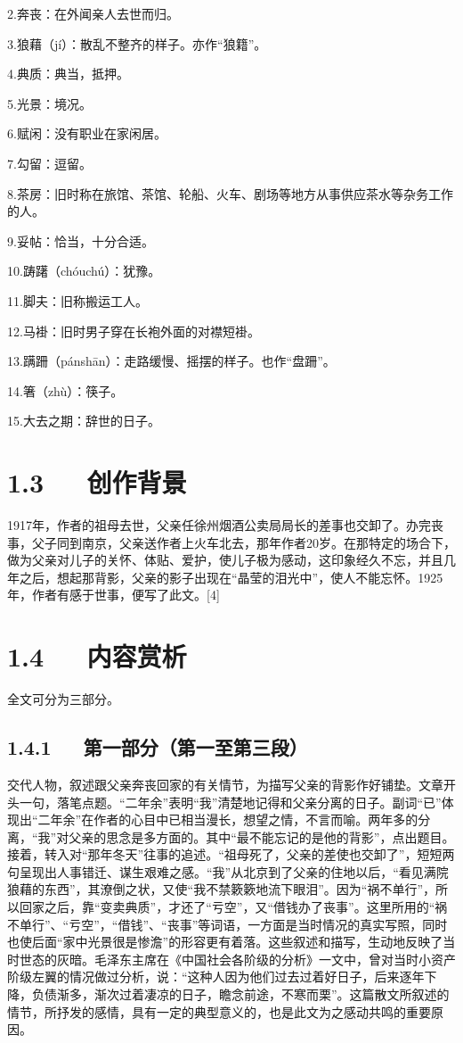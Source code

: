 \documentclass[letterpaper,10pt,english]{sphinxmanual}
\begin{document}
2.奔丧：在外闻亲人去世而归。

3.狼藉（jí）：散乱不整齐的样子。亦作“狼籍”。

4.典质：典当，抵押。

5.光景：境况。

6.赋闲：没有职业在家闲居。

7.勾留：逗留。

8.茶房：旧时称在旅馆、茶馆、轮船、火车、剧场等地方从事供应茶水等杂务工作的人。

9.妥帖：恰当，十分合适。

10.踌躇（chóuchú）：犹豫。

11.脚夫：旧称搬运工人。

12.马褂：旧时男子穿在长袍外面的对襟短褂。

13.蹒跚（pánshān）：走路缓慢、摇摆的样子。也作“盘跚”。

14.箸（zhù）：筷子。

15.大去之期：辞世的日子。


\section{1.3   创作背景}
\label{\detokenize{p01_u6563_u6587/_u6731_u81ea_u6e05-_u80cc_u5f71:id5}}
1917年，作者的祖母去世，父亲任徐州烟酒公卖局局长的差事也交卸了。办完丧事，父子同到南京，父亲送作者上火车北去，那年作者20岁。在那特定的场合下，做为父亲对儿子的关怀、体贴、爱护，使儿子极为感动，这印象经久不忘，并且几年之后，想起那背影，父亲的影子出现在“晶莹的泪光中”，使人不能忘怀。1925年，作者有感于世事，便写了此文。{[}4{]}


\section{1.4   内容赏析}
\label{\detokenize{p01_u6563_u6587/_u6731_u81ea_u6e05-_u80cc_u5f71:id6}}
全文可分为三部分。


\subsection{1.4.1   第一部分（第一至第三段）}
\label{\detokenize{p01_u6563_u6587/_u6731_u81ea_u6e05-_u80cc_u5f71:id7}}
交代人物，叙述跟父亲奔丧回家的有关情节，为描写父亲的背影作好铺垫。文章开头一句，落笔点题。“二年余”表明“我”清楚地记得和父亲分离的日子。副词“已”体现出“二年余”在作者的心目中已相当漫长，想望之情，不言而喻。两年多的分离，“我”对父亲的思念是多方面的。其中“最不能忘记的是他的背影”，点出题目。接着，转入对“那年冬天”往事的追述。“祖母死了，父亲的差使也交卸了”，短短两句呈现出人事错迁、谋生艰难之感。“我”从北京到了父亲的住地以后，“看见满院狼藉的东西”，其潦倒之状，又使“我不禁簌簌地流下眼泪”。因为“祸不单行”，所以回家之后，靠“变卖典质”，才还了“亏空”，又“借钱办了丧事”。这里所用的“祸不单行”、“亏空”，“借钱”、“丧事”等词语，一方面是当时情况的真实写照，同时也使后面“家中光景很是惨澹”的形容更有着落。这些叙述和描写，生动地反映了当时世态的灰暗。毛泽东主席在《中国社会各阶级的分析》一文中，曾对当时小资产阶级左翼的情况做过分析，说：“这种人因为他们过去过着好日子，后来逐年下降，负债渐多，渐次过着凄凉的日子，瞻念前途，不寒而栗”。这篇散文所叙述的情节，所抒发的感情，具有一定的典型意义的，也是此文为之感动共鸣的重要原因。
\end{document}
